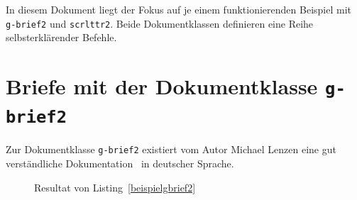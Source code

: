 \documentclass[a4paper,10pt,twoside]{scrbook}
\begin{document}
{In diesem Dokument liegt der Fokus auf je einem funktionierenden Beispiel mit \verb!g-brief2! und \verb!scrlttr2!. Beide Dokumentklassen definieren eine Reihe selbsterklärender Befehle. 

\section{Briefe mit der Dokumentklasse \texttt{g-brief2}}

Zur Dokumentklasse \verb!g-brief2! existiert vom Autor Michael Lenzen eine gut verständliche Dokumentation~\cite{gbrief_Dokumentation} in deutscher Sprache.  




\begin{figure}[H]
    \caption{Resultat von Listing~\ref{beispielgbrief2}}
    \label{fig_gbrief2}
\end{figure}


}
\end{document}
